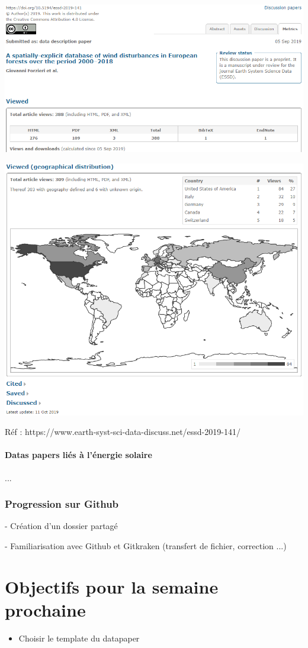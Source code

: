 \documentclass[11pt,oneside]{article}
\begin{document}
\begin{flushleft}
\includegraphics[scale=0.7]{Wind_disturbances_metrics}
\end{flushleft}

\begin{flushleft}
\includegraphics[scale=0.7]{Wind_disturbances_metrics_2}
\end{flushleft}

\begin{flushleft}
Réf : https://www.earth-syst-sci-data-discuss.net/essd-2019-141/
\end{flushleft}

\newpage

\subsection*{Datas papers liés à l'énergie solaire}

...

\section*{Progression sur Github}
- Création d'un dossier partagé

- Familiarisation avec Github et Gitkraken (transfert de fichier, correction ...)


\newpage
\part*{Objectifs pour la semaine prochaine}
\begin{itemize}
	\item Choisir le template du datapaper
	

\end{itemize}
\end{document}

